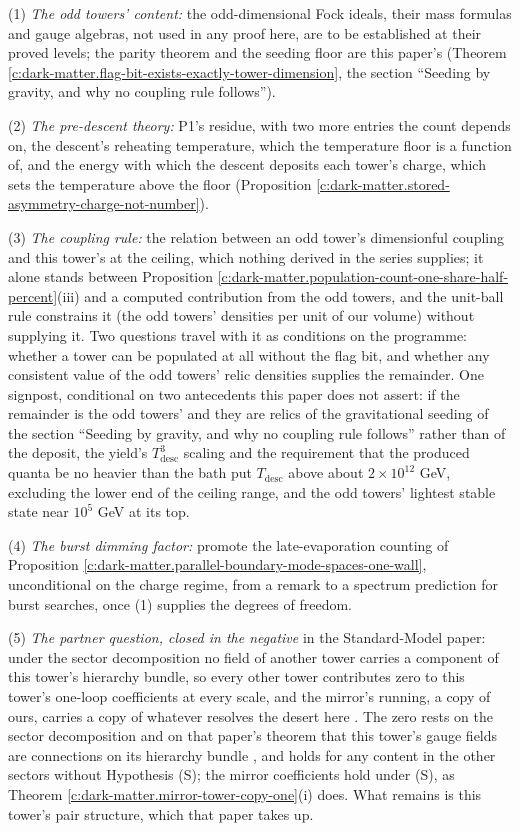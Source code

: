 \documentclass[11pt]{article}
\theoremstyle{definition}
\theoremstyle{plain}
\begin{document}
(1) \emph{The odd towers' content:} the odd-dimensional Fock ideals, their mass formulas and gauge algebras, not used in any proof here, are to be established at their proved levels; the parity theorem and the seeding floor are this paper's (Theorem \ref{c:dark-matter.flag-bit-exists-exactly-tower-dimension}, the section ``Seeding by gravity, and why no coupling rule follows'').

(2) \emph{The pre-descent theory:} P1's residue, with two more entries the count depends on, the descent's reheating temperature, which the temperature floor is a function of, and the energy with which the descent deposits each tower's charge, which sets the temperature above the floor (Proposition \ref{c:dark-matter.stored-asymmetry-charge-not-number}).

(3) \emph{The coupling rule:} the relation between an odd tower's dimensionful coupling and this tower's at the ceiling, which nothing derived in the series supplies; it alone stands between Proposition \ref{c:dark-matter.population-count-one-share-half-percent}(iii) and a computed contribution from the odd towers, and the unit-ball rule constrains it (the odd towers' densities per unit of our volume) without supplying it. Two questions travel with it as conditions on the programme: whether a tower can be populated at all without the flag bit, and whether any consistent value of the odd towers' relic densities supplies the remainder. One signpost, conditional on two antecedents this paper does not assert: if the remainder is the odd towers' and they are relics of the gravitational seeding of the section ``Seeding by gravity, and why no coupling rule follows'' rather than of the deposit, the yield's $T_{\mathrm{desc}}^{3}$ scaling and the requirement that the produced quanta be no heavier than the bath put $T_{\mathrm{desc}}$ above about $2 \times 10^{12}$ GeV, excluding the lower end of the ceiling range, and the odd towers' lightest stable state near $10^{5}$ GeV at its top.

(4) \emph{The burst dimming factor:} promote the late-evaporation counting of Proposition \ref{c:dark-matter.parallel-boundary-mode-spaces-one-wall}, unconditional on the charge regime, from a remark to a spectrum prediction for burst searches, once (1) supplies the degrees of freedom.

(5) \emph{The partner question, closed in the negative} in the Standard-Model paper: under the sector decomposition no field of another tower carries a component of this tower's hierarchy bundle, so every other tower contributes zero to this tower's one-loop coefficients at every scale, and the mirror's running, a copy of ours, carries a copy of whatever resolves the desert here \cite[Prop.~8.5, Cor.~8.6]{ButlerT12}. The zero rests on the sector decomposition and on that paper's theorem that this tower's gauge fields are connections on its hierarchy bundle \cite[Prop.~5.7]{ButlerT12}, and holds for any content in the other sectors without Hypothesis (S); the mirror coefficients hold under (S), as Theorem \ref{c:dark-matter.mirror-tower-copy-one}(i) does. What remains is this tower's pair structure, which that paper takes up.
\end{document}
